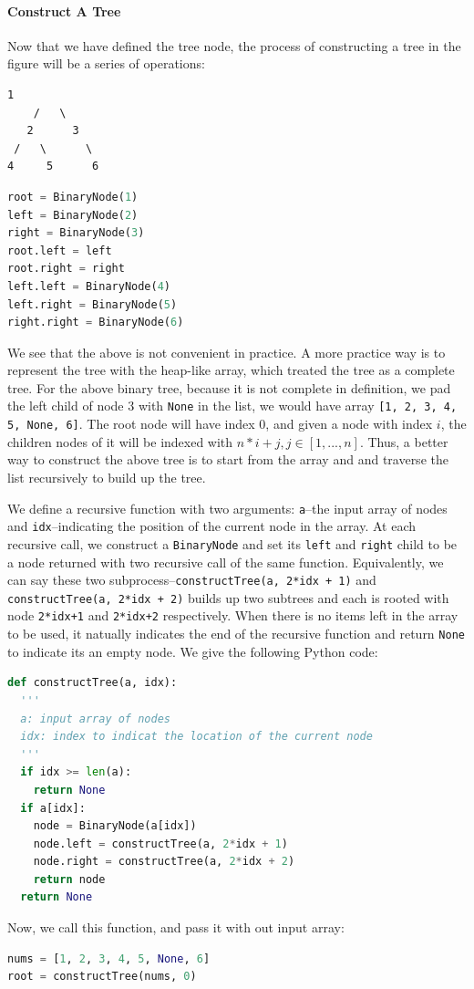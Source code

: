 \documentclass[../main.tex]{subfiles}
\begin{document}
\paragraph{Construct A Tree} Now that we have defined the tree node, the process of constructing a tree in the figure will be a series of operations: 
\begin{lstlisting}[numbers=none]
      1
    /   \  
   2      3
 /   \      \
4     5      6 
\end{lstlisting}
\begin{lstlisting}[language=Python]
root = BinaryNode(1)
left = BinaryNode(2)
right = BinaryNode(3)
root.left = left
root.right = right
left.left = BinaryNode(4)
left.right = BinaryNode(5)
right.right = BinaryNode(6)
\end{lstlisting}

We see that the above is not convenient in practice. A more practice way is to represent the tree with the heap-like array, which treated the tree as a complete tree. For the above binary tree, because it is not complete in definition, we pad the left child of node 3 with \texttt{None} in the list, we would have array \texttt{[1, 2, 3, 4, 5, None, 6]}. The root node will have index $0$, and given a node with index $i$, the children nodes of it will be indexed with $n*i+j, j \in [1, ..., n]$.  Thus, a better way to construct the above tree is to start from the array and and traverse the list recursively to build up the tree. 

We define a recursive function with two arguments: \texttt{a}--the input array of nodes and \texttt{idx}--indicating the position of the current node in the array. At each recursive call, we construct a \texttt{BinaryNode} and set its \texttt{left} and \texttt{right} child to be a  node returned with two recursive call of the same function. Equivalently, we can say these two subprocess--\texttt{constructTree(a, 2*idx + 1)} and \texttt{constructTree(a, 2*idx + 2)} builds up two subtrees and each is rooted with node \texttt{2*idx+1} and \texttt{2*idx+2} respectively. When there is no items left in the array to be used, it natually indicates the end of the recursive function and return \texttt{None} to indicate its an empty node. We give the following Python code:
\begin{lstlisting}[language=Python]
def constructTree(a, idx):
  '''
  a: input array of nodes
  idx: index to indicat the location of the current node
  '''
  if idx >= len(a):
    return None
  if a[idx]:
    node = BinaryNode(a[idx])
    node.left = constructTree(a, 2*idx + 1)
    node.right = constructTree(a, 2*idx + 2)
    return node
  return None
\end{lstlisting}
Now, we call this function, and pass it with out input array:
\begin{lstlisting}[language=Python]
nums = [1, 2, 3, 4, 5, None, 6]
root = constructTree(nums, 0)
\end{lstlisting}
\end{document}
